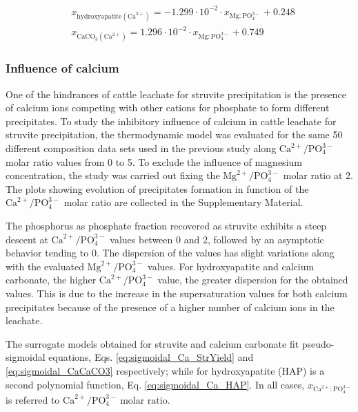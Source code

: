 \begin{refsection}[referencesCh3]
\begin{align}
& x_{\text{hydroxyapatite} \left(\text{Ca}^{2+}\right)} = -1.299 \cdot 10^{-2} \cdot x_{\text{Mg}:\text{PO}_{4}^{3-}} + 0.248 \label{eq:1poly_Mg_CaCO3}\\
& x_{\text{CaCO}_{3} \left(\text{Ca}^{2+}\right)} = 1.296 \cdot 10^{-2} \cdot x_{\text{Mg}:\text{PO}_{4}^{3-}} + 0.749 \label{eq:1poly_Mg_HAP} 
\end{align}

\subsubsection{Influence of calcium}
One of the hindrances of cattle leachate for struvite precipitation is the presence of calcium ions competing with other cations for phosphate to form different precipitates.
To study the inhibitory influence of calcium in cattle leachate for struvite precipitation, the thermodynamic model was evaluated for the same 50 different composition data sets used in the previous study along $\text{Ca}^{2+}/\text{PO}_{4}^{3-}$ molar ratio values from 0 to 5. To exclude the influence of magnesium concentration, the study was carried out fixing the $\text{Mg}^{2+}/\text{PO}_{4}^{3-}$ molar ratio at 2.
The plots showing evolution of precipitates formation in function of the $\text{Ca}^{2+}/\text{PO}_{4}^{3-}$ molar ratio are collected in the Supplementary Material. 

The phosphorus as phosphate fraction recovered as struvite exhibits a steep descent at $\text{Ca}^{2+}/\text{PO}_{4}^{3-}$ values between 0 and 2, followed by an asymptotic behavior tending to 0. The dispersion of the values has slight variations along with the evaluated $\text{Mg}^{2+}/\text{PO}_{4}^{3-}$ values.
For hydroxyapatite and calcium carbonate, the higher $\text{Ca}^{2+}/\text{PO}_{4}^{3-}$ value, the greater dispersion for the obtained values. This is due to the increase in the supersaturation values for both calcium precipitates because of the presence of a higher number of calcium ions in the leachate.

The surrogate models obtained for struvite and calcium carbonate fit pseudo-sigmoidal equations, Eqs. \ref{eq:sigmoidal_Ca_StrYield} and \ref{eq:sigmoidal_CaCaCO3} respectively; while for hydroxyapatite (HAP) is a second polynomial function, Eq. \ref{eq:sigmoidal_Ca_HAP}. In all cases, $ x_{\text{Ca}^{2+}:\text{PO}_{4}^{3-}}$ is referred to $\text{Ca}^{2+}/\text{PO}_{4}^{3-} \ \text{molar ratio}$.


\end{refsection}
